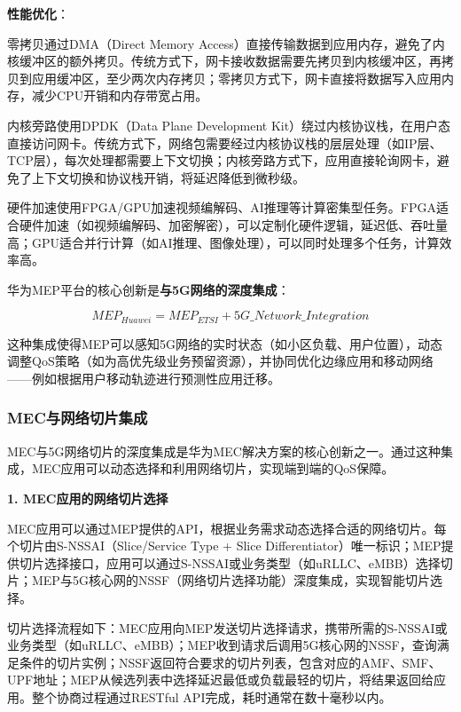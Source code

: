 \textbf{性能优化}：

零拷贝通过DMA（Direct Memory Access）直接传输数据到应用内存，避免了内核缓冲区的额外拷贝。传统方式下，网卡接收数据需要先拷贝到内核缓冲区，再拷贝到应用缓冲区，至少两次内存拷贝；零拷贝方式下，网卡直接将数据写入应用内存，减少CPU开销和内存带宽占用。

内核旁路使用DPDK（Data Plane Development Kit）绕过内核协议栈，在用户态直接访问网卡。传统方式下，网络包需要经过内核协议栈的层层处理（如IP层、TCP层），每次处理都需要上下文切换；内核旁路方式下，应用直接轮询网卡，避免了上下文切换和协议栈开销，将延迟降低到微秒级。

硬件加速使用FPGA/GPU加速视频编解码、AI推理等计算密集型任务。FPGA适合硬件加速（如视频编解码、加密解密），可以定制化硬件逻辑，延迟低、吞吐量高；GPU适合并行计算（如AI推理、图像处理），可以同时处理多个任务，计算效率高。

华为MEP平台的核心创新是\textbf{与5G网络的深度集成}：

\begin{equation}
MEP_{Huawei} = MEP_{ETSI} + 5G\_Network\_Integration
\end{equation}

这种集成使得MEP可以感知5G网络的实时状态（如小区负载、用户位置），动态调整QoS策略（如为高优先级业务预留资源），并协同优化边缘应用和移动网络——例如根据用户移动轨迹进行预测性应用迁移。

\subsubsection{MEC与网络切片集成}

MEC与5G网络切片的深度集成是华为MEC解决方案的核心创新之一。通过这种集成，MEC应用可以动态选择和利用网络切片，实现端到端的QoS保障。

\textbf{1. MEC应用的网络切片选择}

MEC应用可以通过MEP提供的API，根据业务需求动态选择合适的网络切片。每个切片由S-NSSAI（Slice/Service Type + Slice Differentiator）唯一标识；MEP提供切片选择接口，应用可以通过S-NSSAI或业务类型（如uRLLC、eMBB）选择切片；MEP与5G核心网的NSSF（网络切片选择功能）深度集成，实现智能切片选择。

切片选择流程如下：MEC应用向MEP发送切片选择请求，携带所需的S-NSSAI或业务类型（如uRLLC、eMBB）；MEP收到请求后调用5G核心网的NSSF，查询满足条件的切片实例；NSSF返回符合要求的切片列表，包含对应的AMF、SMF、UPF地址；MEP从候选列表中选择延迟最低或负载最轻的切片，将结果返回给应用。整个协商过程通过RESTful API完成，耗时通常在数十毫秒以内。

